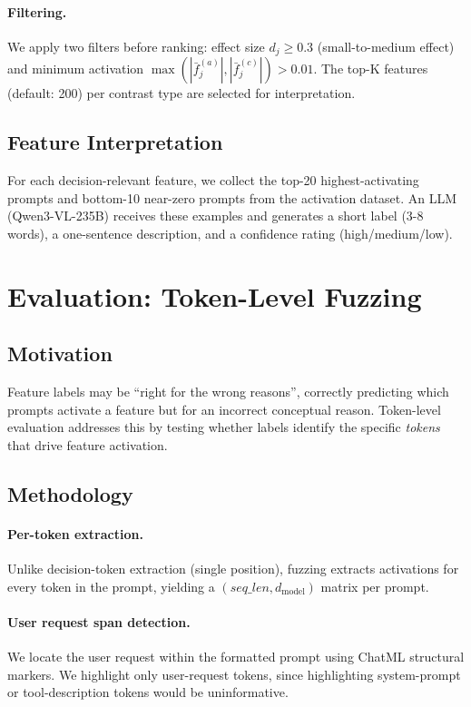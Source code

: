 \documentclass[runningheads]{llncs}
\begin{document}
\paragraph{Filtering.} We apply two filters before ranking: effect size $d_j \geq 0.3$ (small-to-medium effect) and minimum activation $\max(|\bar{f}^{(a)}_j|, |\bar{f}^{(c)}_j|) > 0.01$. The top-K features (default: 200) per contrast type are selected for interpretation.

\subsection{Feature Interpretation}

For each decision-relevant feature, we collect the top-20 highest-activating prompts and bottom-10 near-zero prompts from the activation dataset. An LLM (Qwen3-VL-235B) receives these examples and generates a short label (3-8 words), a one-sentence description, and a confidence rating (high/medium/low).


\section{Evaluation: Token-Level Fuzzing}
\label{sec:evaluation}

\subsection{Motivation}

Feature labels may be ``right for the wrong reasons'', correctly predicting which prompts activate a feature but for an incorrect conceptual reason. Token-level evaluation addresses this by testing whether labels identify the specific \emph{tokens} that drive feature activation.

\subsection{Methodology}

\paragraph{Per-token extraction.} Unlike decision-token extraction (single position), fuzzing extracts activations for every token in the prompt, yielding a $(seq\_len, d_\text{model})$ matrix per prompt.

\paragraph{User request span detection.} We locate the user request within the formatted prompt using ChatML structural markers. We highlight only user-request tokens, since highlighting system-prompt or tool-description tokens would be uninformative.
\end{document}
